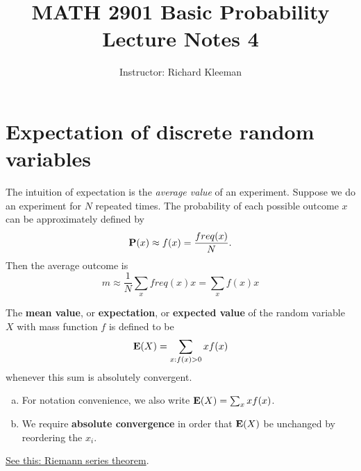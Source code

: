 


\title{MATH 2901 Basic Probability Lecture Notes 4}
\author{Instructor: Richard Kleeman}
\date{}
\maketitle


\section{Expectation of discrete random variables}
The intuition of expectation is the \emph{average value} of an experiment. Suppose we do an experiment for $N$ repeated times. The probability of each possible outcome $x$ can be approximately defined by 
\begin{equation*}
    \mathbf{P}(x) \approx f(x) = \frac{freq(x)}{N}.
\end{equation*}
Then the average outcome is
\begin{equation*}
    m \approx \frac{1}{N}\sum_{x} freq(x)x = \sum_x f(x)x
\end{equation*}

\begin{definition}
The \textbf{mean value}, or \textbf{expectation}, or \textbf{expected value} of the random variable $X$ with mass function $f$ is defined to be 
\begin{equation*}
    \mathbf{E}(X) = \sum_{x:f(x)>0} xf(x)
\end{equation*}
whenever this sum is absolutely convergent.
\end{definition}

\begin{remark}
\begin{enumerate}[(a)]
    \item For notation convenience, we also write $\mathbf{E}(X) = \sum_x xf(x)$.
    \item We require \textbf{absolute convergence} in order that $\mathbf{E}(X)$ be unchanged by reordering the $x_i$. 
\end{enumerate}
\end{remark}

\begin{theorem} \href{https://en.wikipedia.org/wiki/Riemann_series_theorem}{See this: Riemann series theorem}.
\end{theorem}

